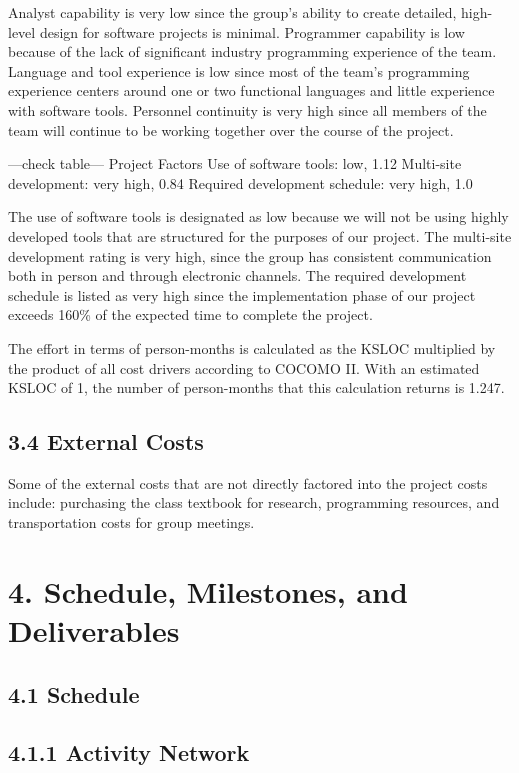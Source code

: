 \documentclass[]{article}
\begin{document}
Analyst capability is very low since the group's ability to create
detailed, high-level design for software projects is minimal. Programmer
capability is low because of the lack of significant industry
programming experience of the team. Language and tool experience is low
since most of the team's programming experience centers around one or
two functional languages and little experience with software tools.
Personnel continuity is very high since all members of the team will
continue to be working together over the course of the project.

---check table--- Project Factors Use of software tools: low, 1.12
Multi-site development: very high, 0.84 Required development schedule:
very high, 1.0

The use of software tools is designated as low because we will not be
using highly developed tools that are structured for the purposes of our
project. The multi-site development rating is very high, since the group
has consistent communication both in person and through electronic
channels. The required development schedule is listed as very high since
the implementation phase of our project exceeds 160\% of the expected
time to complete the project.

The effort in terms of person-months is calculated as the KSLOC
multiplied by the product of all cost drivers according to COCOMO II.
With an estimated KSLOC of 1, the number of person-months that this
calculation returns is 1.247.

\subsection{3.4 External Costs}\label{external-costs}

Some of the external costs that are not directly factored into the
project costs include: purchasing the class textbook for research,
programming resources, and transportation costs for group meetings.

\section{4. Schedule, Milestones, and
Deliverables}\label{schedule-milestones-and-deliverables}

\subsection{4.1 Schedule}\label{schedule}

\subsection{4.1.1 Activity Network}\label{activity-network}
\end{document}
